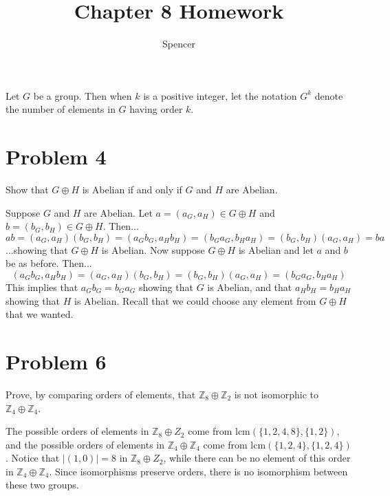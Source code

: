 \documentclass{article}
\title{Chapter 8 Homework}
\author{Spencer}
\begin{document}
\maketitle

\newcommand{\Z}{\mathbb{Z}}
\newcommand{\lcm}{\mbox{lcm}}
\newcommand{\aut}{\mbox{Aut}}

Let $G$ be a group.  Then when $k$ is a positive integer, let the notation $G^k$ denote the
number of elements in $G$ having order $k$.  

\section*{Problem 4}

Show that $G\oplus H$ is Abelian if and only if $G$ and $H$ are Abelian.

Suppose $G$ and $H$ are Abelian.  Let $a=(a_G,a_H)\in G\oplus H$ and
$b=(b_G,b_H)\in G\oplus H$.  Then...
\begin{equation*}
ab = (a_G,a_H)(b_G,b_H)
 = (a_Gb_G,a_Hb_H)
 = (b_Ga_G,b_Ha_H)
 = (b_G,b_H)(a_G,a_H)
 = ba
\end{equation*}
...showing that $G\oplus H$ is Abelian.  Now suppose $G\oplus H$ is
Abelian and let $a$ and $b$ be as before.  Then...
\begin{equation*}
(a_Gb_G,a_Hb_H)
 = (a_G,a_H)(b_G,b_H)
 = (b_G,b_H)(a_G,a_H)
 = (b_Ga_G,b_Ha_H)
\end{equation*}
This implies that $a_Gb_G = b_Ga_G$ showing that $G$ is Abelian, and
that $a_Hb_H = b_Ha_H$ showing that $H$ is Abelian.  Recall that we
could choose any element from $G\oplus H$ that we wanted.

\section*{Problem 6}

Prove, by comparing orders of elements, that $\Z_8\oplus \Z_2$ is not
isomorphic to $\Z_4\oplus \Z_4$.

The possible orders of elements in $\Z_8\oplus Z_2$ come from
$\lcm(\{1,2,4,8\},\{1,2\})$, and the possible orders of elements
in $\Z_4\oplus \Z_4$ come from $\lcm(\{1,2,4\},\{1,2,4\})$.
Notice that $|(1,0)|=8$ in $\Z_8\oplus Z_2$, while there can
be no element of this order in $\Z_4\oplus \Z_4$.  Since isomorphisms
preserve orders, there is no isomorphism between these two groups.
\end{document}
